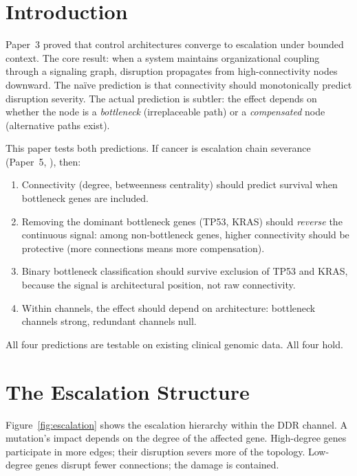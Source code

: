 \documentclass[11pt]{article}
\begin{document}
\section{Introduction}
\label{sec:intro}

Paper~3 \cite{McCarthy2026_BCA} proved that control architectures
converge to escalation under bounded context. The core result:
when a system maintains organizational coupling through a
signaling graph, disruption propagates from high-connectivity
nodes downward. The na\"ive prediction is that connectivity should
monotonically predict disruption severity. The actual prediction
is subtler: the effect depends on whether the node is a
\emph{bottleneck} (irreplaceable path) or a \emph{compensated}
node (alternative paths exist).

This paper tests both predictions. If cancer is escalation chain
severance (Paper~5, \cite{McCarthy2026e}), then:

\begin{enumerate}
\item Connectivity (degree, betweenness centrality) should predict
survival when bottleneck genes are included.
\item Removing the dominant bottleneck genes (TP53, KRAS) should
\emph{reverse} the continuous signal: among non-bottleneck genes,
higher connectivity should be protective (more connections means
more compensation).
\item Binary bottleneck classification should survive exclusion
of TP53 and KRAS, because the signal is architectural position,
not raw connectivity.
\item Within channels, the effect should depend on architecture:
bottleneck channels strong, redundant channels null.
\end{enumerate}

All four predictions are testable on existing clinical genomic data.
All four hold.

\section{The Escalation Structure}
\label{sec:escalation}

Figure~\ref{fig:escalation} shows the escalation hierarchy within
the DDR channel. A mutation's impact depends on the degree of the
affected gene. High-degree genes participate in more edges; their
disruption severs more of the topology. Low-degree genes disrupt
fewer connections; the damage is contained.
\end{document}
